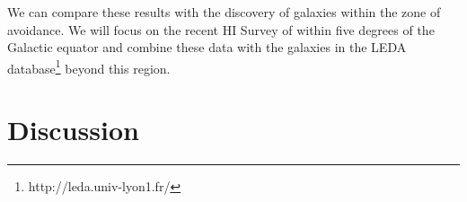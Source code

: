 \documentclass[useAMS,usenatbib]{mn2e}
\begin{document}
We can compare these results with the discovery of galaxies within the
zone of avoidance.  We will focus on the recent HI Survey of
\citet{2016AJ....151...52S} within five degrees of the Galactic
equator and combine these data with the galaxies in the LEDA
database\footnote{http://leda.univ-lyon1.fr/}
\citep{2014A&A...570A..13M} beyond this region.

\section{Discussion}





\label{lastpage}
\end{document}

